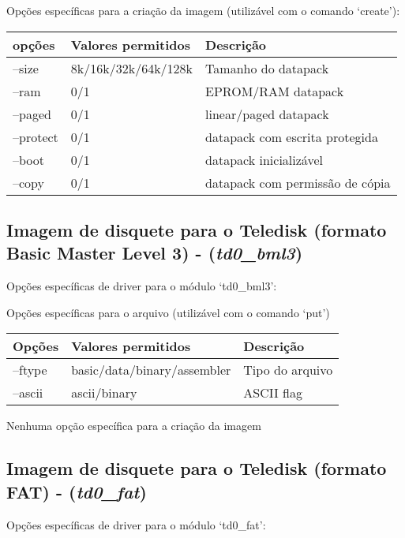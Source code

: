 \documentclass[letterpaper,10pt,brazil]{sphinxmanual}
\begin{document}
Opções específicas para a criação da imagem (utilizável com o comando `create'):

\noindent\begin{tabulary}{\linewidth}{|L|L|L|}
\hline

opções
&
Valores permitidos
&
Descrição
\\
\hline
--size
&
8k/16k/32k/64k/128k
&
Tamanho do datapack
\\
\hline
--ram
&
0/1
&
EPROM/RAM datapack
\\
\hline
--paged
&
0/1
&
linear/paged datapack
\\
\hline
--protect
&
0/1
&
datapack com escrita protegida
\\
\hline
--boot
&
0/1
&
datapack inicializável
\\
\hline
--copy
&
0/1
&
datapack com permissão de cópia
\\
\hline\end{tabulary}



\subsection{Imagem de disquete para o Teledisk (formato Basic Master Level 3) - (\emph{td0\_bml3})}
\label{tools/imgtool:imagem-de-disquete-para-o-teledisk-formato-basic-master-level-3-td0-bml3}
Opções específicas de driver para o módulo `td0\_bml3':

Opções específicas para o arquivo (utilizável com o comando `put')

\noindent\begin{tabulary}{\linewidth}{|L|L|L|}
\hline

Opções
&
Valores permitidos
&
Descrição
\\
\hline
--ftype
&
basic/data/binary/assembler
&
Tipo do arquivo
\\
\hline
--ascii
&
ascii/binary
&
ASCII flag
\\
\hline\end{tabulary}


Nenhuma opção específica para a criação da imagem


\subsection{Imagem de disquete para o Teledisk (formato FAT) - (\emph{td0\_fat})}
\label{tools/imgtool:imagem-de-disquete-para-o-teledisk-formato-fat-td0-fat}
Opções específicas de driver para o módulo `td0\_fat':
\end{document}

